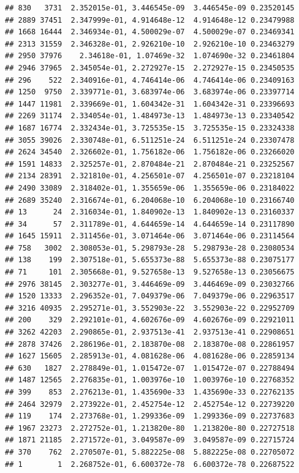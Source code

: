 \documentclass[
]{article}
\begin{document}
\begin{verbatim}
## 830   3731  2.352015e-01, 3.446545e-09  3.446545e-09 0.23520145
## 2889 37451  2.347999e-01, 4.914648e-12  4.914648e-12 0.23479988
## 1668 16444  2.346934e-01, 4.500029e-07  4.500029e-07 0.23469341
## 2313 31559  2.346328e-01, 2.926210e-10  2.926210e-10 0.23463279
## 2950 37976    2.34618e-01, 1.07469e-32  1.074690e-32 0.23461804
## 2946 37965  2.345054e-01, 2.272927e-15  2.272927e-15 0.23450535
## 296    522  2.340916e-01, 4.746414e-06  4.746414e-06 0.23409163
## 1250  9750  2.339771e-01, 3.683974e-06  3.683974e-06 0.23397714
## 1447 11981  2.339669e-01, 1.604342e-31  1.604342e-31 0.23396693
## 2269 31174  2.334054e-01, 1.484973e-13  1.484973e-13 0.23340542
## 1687 16774  2.332434e-01, 3.725535e-15  3.725535e-15 0.23324338
## 3055 39026  2.330748e-01, 6.511251e-24  6.511251e-24 0.23307478
## 2624 34540  2.326602e-01, 1.756182e-06  1.756182e-06 0.23266020
## 1591 14833  2.325257e-01, 2.870484e-21  2.870484e-21 0.23252567
## 2134 28391  2.321810e-01, 4.256501e-07  4.256501e-07 0.23218104
## 2490 33089  2.318402e-01, 1.355659e-06  1.355659e-06 0.23184022
## 2689 35240  2.316674e-01, 6.204068e-10  6.204068e-10 0.23166740
## 13      24  2.316034e-01, 1.840902e-13  1.840902e-13 0.23160337
## 34      57  2.311789e-01, 4.644659e-14  4.644659e-14 0.23117890
## 1645 15911  2.311456e-01, 3.071464e-06  3.071464e-06 0.23114564
## 758   3002  2.308053e-01, 5.298793e-28  5.298793e-28 0.23080534
## 138    199  2.307518e-01, 5.655373e-88  5.655373e-88 0.23075177
## 71     101  2.305668e-01, 9.527658e-13  9.527658e-13 0.23056675
## 2976 38145  2.303277e-01, 3.446469e-09  3.446469e-09 0.23032766
## 1520 13333  2.296352e-01, 7.049379e-06  7.049379e-06 0.22963517
## 3216 40935  2.295271e-01, 3.552903e-22  3.552903e-22 0.22952709
## 200    329  2.292101e-01, 4.602676e-09  4.602676e-09 0.22921011
## 3262 42203  2.290865e-01, 2.937513e-41  2.937513e-41 0.22908651
## 2878 37426  2.286196e-01, 2.183870e-08  2.183870e-08 0.22861957
## 1627 15605  2.285913e-01, 4.081628e-06  4.081628e-06 0.22859134
## 630   1827  2.278849e-01, 1.015472e-07  1.015472e-07 0.22788494
## 1487 12565  2.276835e-01, 1.003976e-10  1.003976e-10 0.22768352
## 399    853  2.276213e-01, 1.435690e-33  1.435690e-33 0.22762135
## 2464 32979  2.273922e-01, 2.452754e-12  2.452754e-12 0.22739220
## 119    174  2.273768e-01, 1.299336e-09  1.299336e-09 0.22737683
## 1967 23273  2.272752e-01, 1.213820e-80  1.213820e-80 0.22727518
## 1871 21185  2.271572e-01, 3.049587e-09  3.049587e-09 0.22715724
## 370    762  2.270507e-01, 5.882225e-08  5.882225e-08 0.22705072
## 1        1  2.268752e-01, 6.600372e-78  6.600372e-78 0.22687522

\end{verbatim}
\end{document}
